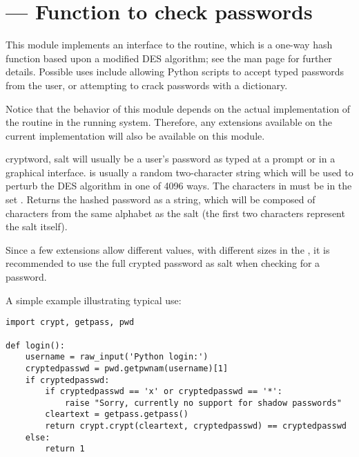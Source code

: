 \section{ ---
         Function to check \UNIX{} passwords}



This module implements an interface to the
 routine, which is a one-way hash
function based upon a modified DES algorithm; see
the \UNIX{} man page for further details.  Possible uses include
allowing Python scripts to accept typed passwords from the user, or
attempting to crack \UNIX{} passwords with a dictionary.

Notice that the behavior of this module depends on the actual implementation 
of the  routine in the running system. 
Therefore, any extensions available on the current implementation will also 
be available on this module.
\begin{funcdesc}{crypt}{word, salt} 
   will usually be a user's password as typed at a prompt or 
  in a graphical interface.   is usually a random
  two-character string which will be used to perturb the DES algorithm
  in one of 4096 ways.  The characters in  must be in the
  set \regexp{[./a-zA-Z0-9]}.  Returns the hashed password as a
  string, which will be composed of characters from the same alphabet
   as the salt (the first two characters represent the salt itself).

  Since a few  extensions allow different
  values, with different sizes in the , it is recommended to use 
  the full crypted password as salt when checking for a password.
\end{funcdesc}


A simple example illustrating typical use:

\begin{verbatim}
import crypt, getpass, pwd

def login():
    username = raw_input('Python login:')
    cryptedpasswd = pwd.getpwnam(username)[1]
    if cryptedpasswd:
        if cryptedpasswd == 'x' or cryptedpasswd == '*': 
            raise "Sorry, currently no support for shadow passwords"
        cleartext = getpass.getpass()
        return crypt.crypt(cleartext, cryptedpasswd) == cryptedpasswd
    else:
        return 1
\end{verbatim}
